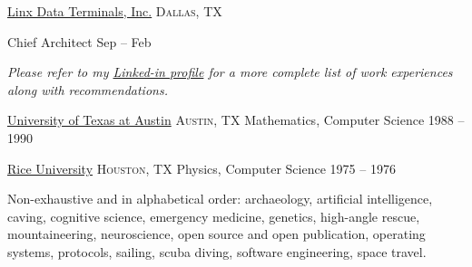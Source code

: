 \documentclass[10pt,letterpaper]{article}
\begin{document}
	\vspace*{1em}
	\headedsection
	{\href{http://www.linxdata.com/}{Linx Data Terminals, Inc.}}
	{\textsc{Dallas, TX}} {%
							
		\headedsubsection
		{Chief Architect}
		{Sep  -- Feb }

	}
							
	\vspace{-0.2em}
	\begin{center}
		\emph{\small Please refer to my \href{http://www.linkedin.com/in/jfogarty}{Linked-in profile} for a more complete list of work experiences along with recommendations.}
	\end{center}

\spacedhrule{0.5em}{-0.4em}


\headedsection
{\href{https://www.utexas.edu/}{University of Texas at Austin}}
{\textsc{Austin, TX}} {%
	\headedsubsection
	{Mathematics, Computer Science}
	{1988 -- 1990} {}
}

\headedsection
{\href{http://www.rice.edu/}{Rice University}}
{\textsc{Houston, TX}} {%
	\headedsubsection
	{Physics, Computer Science}
	{1975 -- 1976} {}
}


\vspace{1em}\spacedhrule{-0.2em}{-0.4em}


\inlineheadsection
  {Non-exhaustive and in alphabetical order:}
  {archaeology, artificial intelligence, caving, cognitive science, emergency medicine, genetics, high-angle rescue, mountaineering, neuroscience, open source and open publication, operating systems, protocols, sailing, scuba diving, software engineering, space travel.}
\end{document}
